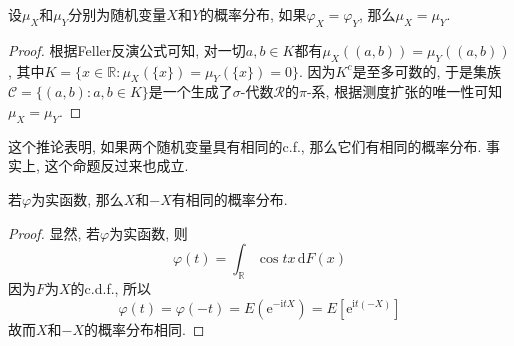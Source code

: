 \documentclass[cn, 12pt, math=mtpro2, bibstyle=apa, blue, twocol]{elegantbook}
\newcommand{\R}{\mathbb{R}}
\begin{document}
\begin{corollary}
设$\mu_X$和$\mu_Y$分别为随机变量$X$和$Y$的概率分布, 如果$\varphi_X=\varphi_Y$, 那么$\mu_X=\mu_Y$.
\end{corollary}
\begin{proof}
  根据Feller反演公式可知, 对一切$a, b\in K$都有$\mu_X((a,b))=\mu_Y((a,b))$, 其中$K=\{x\in\R: \mu_X(\{x\})=\mu_Y(\{x\})=0\}$. 因为$K^c$是至多可数的, 于是集族$\mathcal{C}=\{(a,b): a,b\in K\}$是一个生成了$\sigma$-代数$\mathcal{R}$的$\pi$-系, 根据测度扩张的唯一性可知$\mu_X=\mu_Y$.
\end{proof}
\begin{remark}
这个推论表明, 如果两个随机变量具有相同的c.f., 那么它们有相同的概率分布. 事实上, 这个命题反过来也成立.
\end{remark}
\begin{corollary}
若$\varphi$为实函数, 那么$X$和$-X$有相同的概率分布.
\end{corollary}
\begin{proof}
  显然, 若$\varphi$为实函数, 则
  $$\varphi(t)=\int_\R\cos tx\,\text{d}F(x)$$
  因为$F$为$X$的c.d.f., 所以
  $$\varphi(t)=\varphi(-t)=E(\text{e}^{-\text{i}tX})=E[\text{e}^{\text{i}t(-X)}]$$
  故而$X$和$-X$的概率分布相同.
\end{proof}
\end{document}
